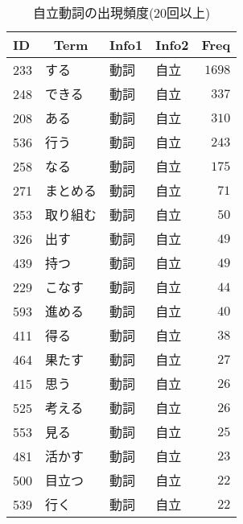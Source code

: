 %
\begin{table}[!tbp]
\caption{自立動詞の出現頻度(20回以上)\label{tab:自立動詞}} 
\begin{center}
\begin{tabular}{llllr}
\toprule
\multicolumn{1}{l}{ID}&\multicolumn{1}{c}{Term}&\multicolumn{1}{c}{Info1}&\multicolumn{1}{c}{Info2}&\multicolumn{1}{c}{Freq}\tabularnewline
\midrule
233&する&動詞&自立&$1698$\tabularnewline
248&できる&動詞&自立&$ 337$\tabularnewline
208&ある&動詞&自立&$ 310$\tabularnewline
536&行う&動詞&自立&$ 243$\tabularnewline
258&なる&動詞&自立&$ 175$\tabularnewline
271&まとめる&動詞&自立&$  71$\tabularnewline
353&取り組む&動詞&自立&$  50$\tabularnewline
326&出す&動詞&自立&$  49$\tabularnewline
439&持つ&動詞&自立&$  49$\tabularnewline
229&こなす&動詞&自立&$  44$\tabularnewline
593&進める&動詞&自立&$  40$\tabularnewline
411&得る&動詞&自立&$  38$\tabularnewline
464&果たす&動詞&自立&$  27$\tabularnewline
415&思う&動詞&自立&$  26$\tabularnewline
525&考える&動詞&自立&$  26$\tabularnewline
553&見る&動詞&自立&$  25$\tabularnewline
481&活かす&動詞&自立&$  23$\tabularnewline
500&目立つ&動詞&自立&$  22$\tabularnewline
539&行く&動詞&自立&$  22$\tabularnewline
\bottomrule
\end{tabular}
\end{center}
\end{table}

